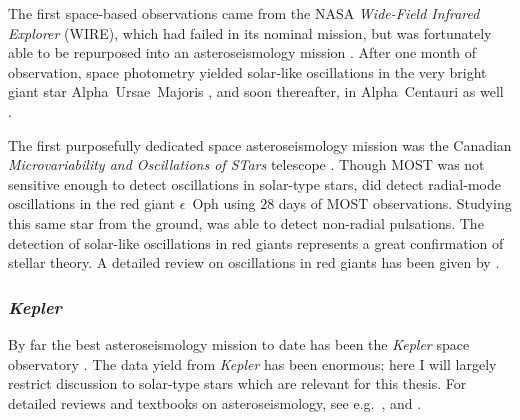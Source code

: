 The first space-based observations came from the NASA \emph{Wide-Field Infrared Explorer} (\textsc{WIRE}), which had failed in its nominal mission, but was fortunately able to be repurposed into an asteroseismology mission \citep{2000ASPC..198..557B}. 
After one month of observation, space photometry yielded solar-like oscillations in the very bright giant star Alpha~Ursae~Majoris \citep{2000ApJ...532L.133B}, and soon thereafter, in Alpha~Centauri as well \citep{2001ESASP.464..391S}. 

The first purposefully dedicated space asteroseismology mission was the Canadian \emph{Microvariability and Oscillations of STars} telescope \citep[\textsc{MOST},][duration 2003--2014]{2003PASP..115.1023W}. 
Though \textsc{MOST} was not sensitive enough to detect oscillations in solar-type stars, \citet{2006ESASP.624E..30B, 2007A&A...468.1033B} did detect radial-mode oscillations in the red giant $\epsilon$~Oph using $28$ days of MOST observations. 
Studying this same star from the ground, \citet{2006A&A...454..943H} was able to detect non-radial pulsations. 
The detection of solar-like oscillations in red giants represents a great confirmation of stellar theory. 
A detailed review on oscillations in red giants has been given by \citet{2017A&ARv..25....1H}. 



\subsubsection*{\emph{Kepler}}

By far the best asteroseismology mission to date has been the \emph{Kepler} space observatory \citep[][duration 2009--2013]{2010ApJ...713L..79K}. 
The data yield from \emph{Kepler} has been enormous; here I will largely restrict discussion to solar-type stars which are relevant for this thesis. 
For detailed reviews and textbooks on asteroseismology, see e.g.\ \citealt{2010aste.book.....a, 2012AN....333..914C, 2013adspr..52.1581h, 2013ARA&A..51..353C}, and \citealt{basuchaplin2017}. 

